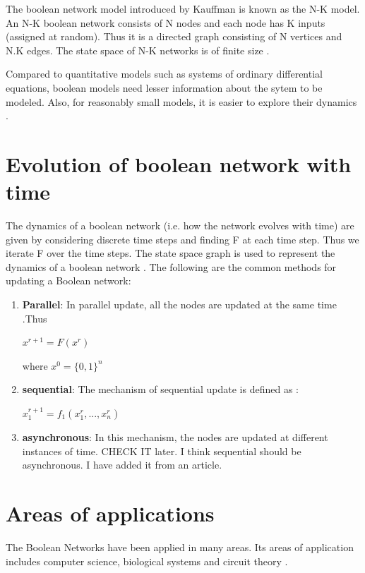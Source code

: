 \documentclass[11pt]{report}
\begin{document}
    The boolean network model introduced by Kauffman is known as the N-K model. An N-K boolean network consists of N nodes and each node has K inputs (assigned at random). Thus it is a directed
    graph consisting of N vertices and N.K edges. The state space of N-K networks is of finite size \cite{Greil2012}.
    
    Compared to quantitative models such as systems of ordinary differential equations, boolean models need lesser information about the sytem to be modeled. Also, for reasonably
    small models, it is easier to explore their dynamics \cite{Dimitrova2011}.
    \section{\color{red} Evolution of boolean network with time}
    The dynamics of a boolean network (i.e. how the network evolves with time) are given by considering discrete time steps and finding F at each time step.
    Thus we iterate F over the time steps. The state space graph is used to represent the dynamics of a boolean network \cite{Veliz-Cuba2011}.
    The following are the common methods for updating a Boolean network:
    \begin{enumerate}
     \item \textbf{Parallel}: In parallel update, all the nodes are updated at the same time \cite{Goles2010}.Thus
     \begin{center} $x^{r+1}=F(x^{r})$\end{center}
     where $x^{0}=\{0,1\}^{n}$
     \item \textbf{sequential}: The mechanism of sequential update is defined as \cite{Goles2010}:
     \begin{center}
      $x_{1}^{r+1}=f_{1}(x_{1}^{r},...,x_{n}^{r})$
     \end{center} 
     \begin{center}
     \end{center}
     \item \textbf{asynchronous}: In this mechanism, the nodes are updated at different instances of time.
     {\color{red}CHECK IT later. I think sequential should be asynchronous. I have added it from an article.}
    \end{enumerate}

    \section{Areas of applications}
    The Boolean Networks have been applied in many areas.
    Its areas of application includes computer science, biological systems and circuit theory \cite{Goles2010}.
    
\end{document}
